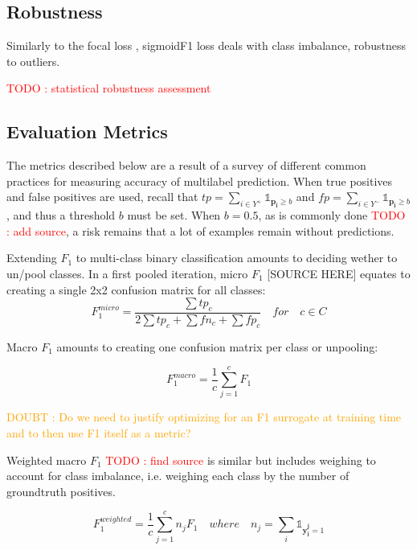 \documentclass[sigconf,natbib,screen=true,review=true,anonymous]{acmart}
\newcommand\todo[1]{\textcolor{red}{TODO : #1}}
\newcommand\doubt[1]{\textcolor{orange}{DOUBT : #1}}
\begin{document}
\subsection{Robustness}
\label{sec:org6c7c3d0}


Similarly to the focal loss \cite{focalLoss}, sigmoidF1 loss deals with class imbalance, robustness to outliers.

\todo{statistical robustness assessment}



\subsection{Evaluation Metrics}
\label{sec:org23c8447}

The metrics described below are a result of a survey of different common practices for measuring accuracy of multilabel prediction. When true positives and false positives are used, recall that \(t p=\sum_{i \in Y^{+}} \mathds{1}_{\mathbf{p_i} \geq b}\) and \(f p=\sum_{i \in Y^{-}} \mathds{1}_{\mathbf{p_i} \geq b}\), and thus a threshold \(b\) must be set. When \(b = 0.5\), as is commonly done \todo{add source}, a risk remains that a lot of examples remain without predictions.

Extending \(F_1\) to multi-class binary classification amounts to deciding wether to un/pool classes.
In a first pooled iteration, micro \(F_1\) [SOURCE HERE] equates to creating a single 2x2 confusion matrix for all classes:
$$F_1^{micro} = \frac{\sum tp_c}{2 \sum tp_c + \sum fn_c + \sum fp_c} \quad for \quad c \in C$$

Macro \(F_1\) \cite{threshForF1} amounts to creating one confusion matrix per class or unpooling:

$$F_1^{macro} = \frac{1}{c} \sum_{j=1}^c F_1$$

\doubt{Do we need to justify optimizing for an F1 surrogate at training time and to then use F1 itself as a metric?}

Weighted macro \(F_1\) \todo{find source} is similar but includes weighing to account for class imbalance, i.e. weighing each class by the number of groundtruth positives.

$$F_1^{weighted} = \frac{1}{c} \sum_{j=1}^c n_j F_1 \quad where \quad n_j = \sum_i \mathds{1}_{\mathbf{y_i^j} = 1}$$

\end{document}
